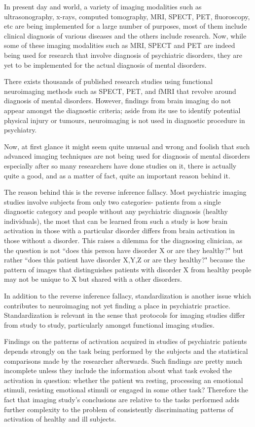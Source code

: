 \documentclass{article}
\begin{document}
In present day and world, a variety of imaging modalities such as
ultrasonography, x-rays, computed tomography, MRI, SPECT, PET,
fluoroscopy, etc are being implemented for a large number of purposes,
most of them include clinical diagnosis of various diseases and the
others include research. Now, while some of these imaging modalities
such as MRI, SPECT and PET are indeed being used for research that
involve diagnosis of psychiatric disorders, they are yet to be
implemented for the actual diagnosis of mental disorders.

There exists thousands of published research studies using functional
neuroimaging methods such as SPECT, PET, and fMRI that revolve around
diagnosis of mental disorders. However, findings from brain imaging do
not appear amongst the diagnostic criteria; aside from its use to
identify potential physical injury or tumours, neuroimaging is not
used in diagnostic procedure in psychiatry.

Now, at first glance it might seem quite unusual and wrong and foolish
that such advanced imaging techniques are not being used for diagnosis
of mental disorders especially after so many researchers have done
studies on it, there is actually quite a good, and as a matter of
fact, quite an important reason behind it.

The reason behind this is the reverse inference fallacy. Most
psychiatric imaging studies involve subjects from only two categories-
patients from a single diagnostic category and people without any
psychiatric diagnosis (healthy individuals), the most that can be
learned from such a study is how brain activation in those with a
particular disorder differs from brain activation in those without a
disorder. This raises a dilemma for the diagnosing clinician, as the
question is not ``does this person have disorder X or are they
healthy?" but rather ``does this patient have disorder X,Y,Z or are
they healthy?" because the pattern of images that distinguishes
patients with disorder X from healthy people may not be unique to X
but shared with a other disorders.

In addition to the reverse inference fallacy, standardization is
another issue which contributes to neuroimaging not yet finding a
place in psychiatric practice. Standardization is relevant in the
sense that protocols for imaging studies differ from study to study,
particularly amongst functional imaging studies.

Findings on the patterns of activation acquired in studies of
psychiatric patients depends strongly on the task being performed by
the subjects and the statistical comparisons made by the researcher
afterwards. Such findings are pretty much incomplete unless they
include the information about what task evoked the activation in
question: whether the patient wa resting, processing an emotional
stimuli, resisting emotional stimuli or engaged in some other task?
Therefore the fact that imaging study's conclusions are relative to
the tasks performed adds further complexity to the problem of
consistently discriminating patterns of activation of healthy and ill
subjects.
\end{document}
